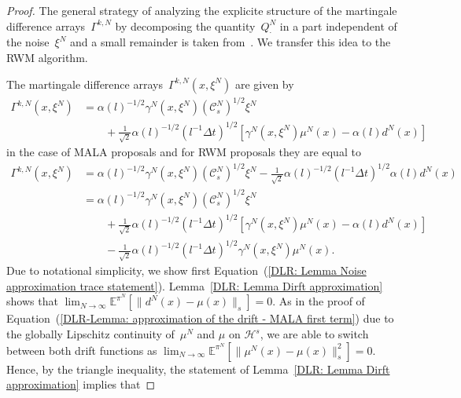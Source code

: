 \begin{proof}
  The general strategy of analyzing the explicite structure of the martingale difference arrays~$\Gamma^{k,N}$ by decomposing the quantity~$Q^N_{\cdot}$ in a part independent of the noise~$\xi^N$ and a small remainder is taken from~\autocite[Lemma 4.8]{Pillai2012}. We transfer this idea to the RWM algorithm.
  
  The martingale difference arrays~$\Gamma^{k,N}(x, \xi^N)$ are given by
  \begin{equation}
    \label{DLR: Lemma Noise approximation - Gamma MALA}
    \begin{split}
      \Gamma^{k,N}(x, \xi^N) & = \alpha(l)^{-1/2} \gamma^N(x, \xi^N) (\mathcal{C}_s^N)^{1/2} \xi^N \\
      & \qquad +\frac{1}{\sqrt{2}} \alpha(l)^{-1/2} (l^{-1}\Delta t)^{1/2} \left[\gamma^N(x, \xi^N) \mu^N(x) - \alpha(l) d^N(x)  \right]
    \end{split}
  \end{equation}
  in the case of MALA proposals and for RWM proposals they are equal to
   \begin{equation}
    \label{DLR: Lemma Noise approximation - Gamma RWM}
    \begin{split}
      \Gamma^{k,N}(x, \xi^N) & = \alpha(l)^{-1/2} \gamma^N(x, \xi^N) (\mathcal{C}_s^N)^{1/2} \xi^N  -\frac{1}{\sqrt{2}} \alpha(l)^{-1/2} (l^{-1}\Delta t)^{1/2}  \alpha(l) d^N(x)\\
      & = \alpha(l)^{-1/2} \gamma^N(x, \xi^N) (\mathcal{C}_s^N)^{1/2} \xi^N \\
      & \qquad +\frac{1}{\sqrt{2}} \alpha(l)^{-1/2} (l^{-1}\Delta t)^{1/2} \left[\gamma^N(x, \xi^N) \mu^N(x) - \alpha(l) d^N(x)  \right]\\
      & \qquad -\frac{1}{\sqrt{2}} \alpha(l)^{-1/2} (l^{-1}\Delta t)^{1/2} \gamma^N(x, \xi^N) \mu^N(x) .
    \end{split}
  \end{equation}
  Due to notational simplicity, we show first Equation~(\ref{DLR: Lemma Noise approximation trace statement}). Lemma~\ref{DLR: Lemma Dirft approximation} shows that $\lim_{N \to \infty} \mathbb{E}^{\pi^N}[ \|  d^N(x) - \mu(x) \|_{s} ] = 0$. As in the proof of Equation~(\ref{DLR-Lemma: approximation of the drift - MALA first term}) due to the globally Lipschitz continuity of~$\mu^N$ and $\mu$ on $\mathcal{H}^s$, we are able to switch between both drift functions as $ \lim_{N \to \infty} \mathbb{E}^{\pi^N}[ \|  \mu^N(x) - \mu(x)\|_{s}^2] = 0$. Hence, by the triangle inequality, the statement of Lemma~\ref{DLR: Lemma Dirft approximation} implies that

\end{proof}
